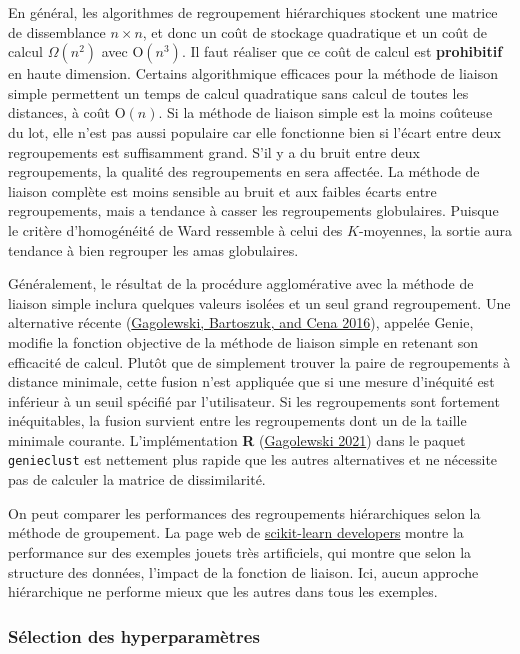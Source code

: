 \documentclass[
  11pt,
  letterpaper,
]{scrbook}
\theoremstyle{definition}
\theoremstyle{remark}
\begin{document}
En général, les algorithmes de regroupement hiérarchiques stockent une
matrice de dissemblance \(n \times n\), et donc un coût de stockage
quadratique et un coût de calcul \(\Omega(n^2)\) avec
\(\mathrm{O}(n^3)\). Il faut réaliser que ce coût de calcul est
\textbf{prohibitif} en haute dimension. Certains algorithmique efficaces
pour la méthode de liaison simple permettent un temps de calcul
quadratique sans calcul de toutes les distances, à coût
\(\mathrm{O}(n)\). Si la méthode de liaison simple est la moins coûteuse
du lot, elle n'est pas aussi populaire car elle fonctionne bien si
l'écart entre deux regroupements est suffisamment grand. S'il y a du
bruit entre deux regroupements, la qualité des regroupements en sera
affectée. La méthode de liaison complète est moins sensible au bruit et
aux faibles écarts entre regroupements, mais a tendance à casser les
regroupements globulaires. Puisque le critère d'homogénéité de Ward
ressemble à celui des \(K\)-moyennes, la sortie aura tendance à bien
regrouper les amas globulaires.

Généralement, le résultat de la procédure agglomérative avec la méthode
de liaison simple inclura quelques valeurs isolées et un seul grand
regroupement. Une alternative récente
(\protect\hyperlink{ref-Gagolewski:2016}{Gagolewski, Bartoszuk, and Cena
2016}), appelée Genie, modifie la fonction objective de la méthode de
liaison simple en retenant son efficacité de calcul. Plutôt que de
simplement trouver la paire de regroupements à distance minimale, cette
fusion n'est appliquée que si une mesure d'inéquité est inférieur à un
seuil spécifié par l'utilisateur. Si les regroupements sont fortement
inéquitables, la fusion survient entre les regroupements dont un de la
taille minimale courante. L'implémentation \textbf{R}
(\protect\hyperlink{ref-Gagolewski:2021}{Gagolewski 2021}) dans le
paquet \texttt{genieclust} est nettement plus rapide que les autres
alternatives et ne nécessite pas de calculer la matrice de
dissimilarité.

On peut comparer les performances des regroupements hiérarchiques selon
la méthode de groupement. La page web de
\href{https://scikit-learn.org/stable/auto_examples/cluster/plot_linkage_comparison.html}{scikit-learn
developers} montre la performance sur des exemples jouets très
artificiels, qui montre que selon la structure des données, l'impact de
la fonction de liaison. Ici, aucun approche hiérarchique ne performe
mieux que les autres dans tous les exemples.

\hypertarget{suxe9lection-des-hyperparamuxe8tres}{%
\subsubsection{Sélection des
hyperparamètres}\label{suxe9lection-des-hyperparamuxe8tres}}
\end{document}
